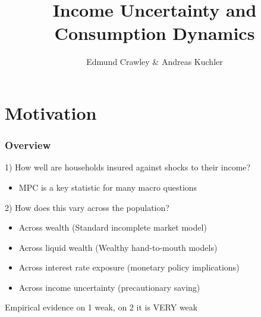 \documentclass{beamer}
\title[Income Uncertainty and Consumption Dynamics]{Income Uncertainty and Consumption Dynamics}
\author{Edmund Crawley \& Andreas Kuchler}
\begin{document}
\frame{\titlepage}

\section{Motivation}
\frame
{
	\frametitle{Overview}
	1) How well are households insured against shocks to their income?\\
	\begin{itemize}
		\item MPC is a key statistic for many macro questions
	\end{itemize}
	2) How does this vary across the population?\\
	\begin{itemize}
		\item Across wealth (Standard incomplete market model)
		\item Across liquid wealth (Wealthy hand-to-mouth models)
		\item Across interest rate exposure (monetary policy implications)
		\item Across income uncertainty (precautionary saving)
	\end{itemize}
	Empirical evidence on 1 weak, on 2 it is VERY weak
}
\frame
\end{document}
